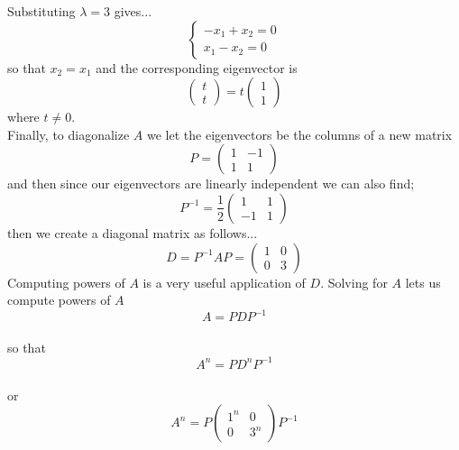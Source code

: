 \documentclass[12pt]{article}
\begin{document}
Substituting $\lambda=3$ gives...\\
$$\left\{ \begin{array}{c}
-x_1+x_2=0 \\
x_1-x_2=0
\end{array} \right.$$
so that $x_2=x_1$ and the corresponding eigenvector is
$$\left( \begin{array}{c}
t \\
t
\end{array} \right )=t
\left( \begin{array}{c}
1 \\
1
\end{array} \right )$$  where $t\ne 0.$\\
Finally, to diagonalize $A$ we let the eigenvectors be the columns of a new matrix\\
$$P=\left( \begin{array}{cc}
1 & -1 \\
1 & 1
\end{array} \right )$$
and then since our eigenvectors are linearly independent we can also find;\\
$$P^{-1}=\frac{1}{2} \left( \begin{array}{cc}
1 & 1 \\
-1 & 1
\end{array} \right )$$
then we create a diagonal matrix as follows...\\
$$D=P^{-1}AP=\left( \begin{array}{cc}
1 & 0 \\
0 & 3
\end{array} \right )$$
Computing powers of $A$ is a very useful application of $D$.  Solving for $A$ lets us compute powers of $A$\\
$$A=PDP^{-1}$$\\
so that\\
$$A^n=PD^nP^{-1}$$\\  or
$$A^n=P\left( \begin{array}{cc}
1^n & 0 \\
0 & 3^n
\end{array} \right )P^{-1}$$\\
\end{document}
